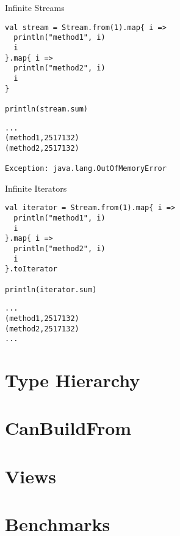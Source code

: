 \documentclass[xcolor=svgnames]{beamer}
\begin{document}
    \begin{frame}[fragile] %
    {Infinite Streams}
        \begin{Verbatim}[formatcom=\sffamily]
val stream = Stream.from(1).map{ i =>
  println("method1", i)
  i
}.map{ i =>
  println("method2", i)
  i
}

println(stream.sum)
        \end{Verbatim}

        \noindent\makebox[\linewidth]{\rule{\paperwidth}{0.4pt}}

        \pause

        \begin{Verbatim}[formatcom=\sffamily]
...
(method1,2517132)
(method2,2517132)

Exception: java.lang.OutOfMemoryError
        \end{Verbatim}
    \end{frame}

    \begin{frame}[fragile] %
    {Infinite Iterators}
        \begin{Verbatim}[formatcom=\sffamily]
val iterator = Stream.from(1).map{ i =>
  println("method1", i)
  i
}.map{ i =>
  println("method2", i)
  i
}.toIterator

println(iterator.sum)
        \end{Verbatim}

        \noindent\makebox[\linewidth]{\rule{\paperwidth}{0.4pt}}

        \pause

        \begin{Verbatim}[formatcom=\sffamily]
...
(method1,2517132)
(method2,2517132)
...
        \end{Verbatim}
    \end{frame}

    \section{Type Hierarchy}

    \section{CanBuildFrom}

    \section{Views}

    \section{Benchmarks}
\end{document}
